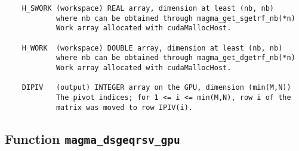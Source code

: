 \documentclass[10pt]{book}
\begin{document}
\begin{verbatim}
    H_SWORK (workspace) REAL array, dimension at least (nb, nb)
            where nb can be obtained through magma_get_sgetrf_nb(*n)
            Work array allocated with cudaMallocHost.

    H_WORK  (workspace) DOUBLE array, dimension at least (nb, nb)
            where nb can be obtained through magma_get_dgetrf_nb(*n)
            Work array allocated with cudaMallocHost.

    DIPIV   (output) INTEGER array on the GPU, dimension (min(M,N))
            The pivot indices; for 1 <= i <= min(M,N), row i of the
            matrix was moved to row IPIV(i).
\end{verbatim}

\newpage
\subsection{Function {\tt {\bf magma\_dsgeqrsv\_gpu}}}
\end{document}
